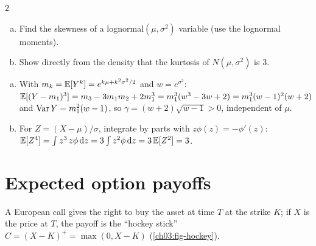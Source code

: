 \begin{paracol}{2}
\begin{exercise}\label{ch03:ex-skewkurt}
\leavevmode
\begin{enumerate}[(a)]
  \item Find the skewness of a lognormal$(\mu,\sigma^2)$ variable (use the lognormal moments).
  \item Show directly
      from the density that the kurtosis of $N(\mu,\sigma^2)$ is 3.
\end{enumerate}
\end{exercise}
\begin{solution}[ch03:ex-skewkurt]
\begin{enumerate}[(a)]
  \item With $m_k=\mathbb{E}[Y^k]=e^{k\mu+k^2\sigma^2/2}$ and $w=e^{\sigma^2}$: $\mathbb{E}[(Y-m_1)^3]=m_3-3m_1m_2+2m_1^3=m_1^3(w^3-3w+2)
        =m_1^3(w-1)^2(w+2)$ and $\operatorname{Var} Y=m_1^2(w-1)$, so $\gamma=(w+2)\sqrt{w-1}>0$, independent of $\mu$.
  \item For $Z=(X-\mu)/\sigma$, integrate by parts with $z\phi(z)=-\phi'(z)$: $\mathbb{E}[Z^4]=\int z^3\,z\phi\,\mathrm{d} z=3\int z^2\phi\,\mathrm{d} z=3\,\mathbb{E}[Z^2]=3$.
\end{enumerate}
\end{solution}

\section{Expected option payoffs}\label{ch03:sec-call}

A European call gives the right to buy the asset at time $T$ at the strike $K$; if $X$ is the price at $T$,
the payoff is the ``hockey stick'' $C=(X-K)^+=\max(0,X-K)$  (\cref{ch03:fig-hockey}).


\end{paracol}
